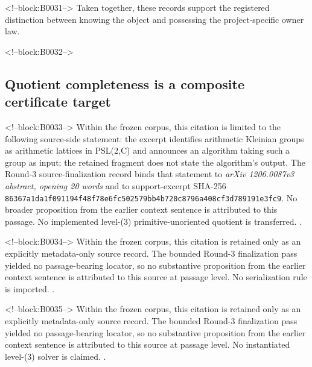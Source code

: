 \documentclass[11pt,a4paper]{article}
\begin{document}
<!--block:B0031-->
Taken together, these records support the registered distinction between knowing the object and possessing the project-specific owner law.

<!--block:B0032-->
\subsection{Quotient completeness is a composite certificate target}

<!--block:B0033-->
Within the frozen corpus, this citation is limited to the following source-side statement: the excerpt identifies arithmetic Kleinian groups as arithmetic lattices in PSL(2,C) and announces an algorithm taking such a group as input; the retained fragment does not state the algorithm's output. The Round-3 source-finalization record binds that statement to \emph{arXiv 1206.0087v3 abstract, opening 20 words} and to support-excerpt SHA-256 \texttt{86367a1d\allowbreak{}a1f09119\allowbreak{}4f48f78e\allowbreak{}6fc50257\allowbreak{}9bb4b720\allowbreak{}c8796a40\allowbreak{}8cf3d789\allowbreak{}191e3fc9}. No broader proposition from the earlier context sentence is attributed to this passage. No implemented level-(3) primitive-unoriented quotient is transferred.
\citep{P29-S10}.

<!--block:B0034-->
Within the frozen corpus, this citation is retained only as an explicitly metadata-only source record. The bounded Round-3 finalization pass yielded no passage-bearing locator, so no substantive proposition from the earlier context sentence is attributed to this source at passage level. No serialization rule is imported.
\citep{P29-S11}.

<!--block:B0035-->
Within the frozen corpus, this citation is retained only as an explicitly metadata-only source record. The bounded Round-3 finalization pass yielded no passage-bearing locator, so no substantive proposition from the earlier context sentence is attributed to this source at passage level. No instantiated level-(3) solver is claimed.
\citep{P29-S15}.
\end{document}
